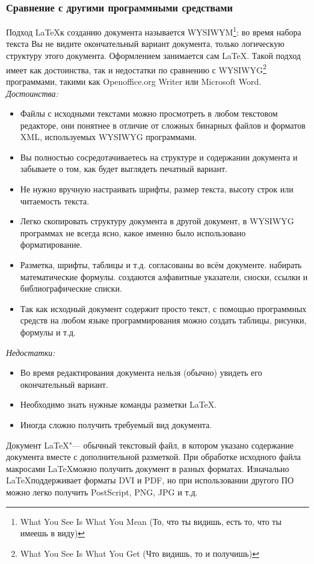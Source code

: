 \documentclass{article}
\begin{document}
		\subsubsection{Сравнение с другими программными средствами}
	Подход \LaTeX к созданию документа называется WYSIWYM\footnote{What You See Is What You Mean (То, что ты видишь, есть то, что ты имеешь в виду)}: во время набора текста Вы не видите окончательный вариант документа, только логическую структуру этого документа. Оформлением занимается сам \LaTeX. Такой подход имеет как достоинства, так и недостатки по сравнению с WYSIWYG\footnote{What You See Is What You Get (Что видишь, то и получишь)} программами, такими как Openoffice.org Writer или Microsoft Word.\\
	\textit{Достоинства:}
	\begin{itemize}
   		\item Файлы с исходными текстами можно просмотреть в любом текстовом редакторе, они понятнее в отличие от сложных бинарных файлов и форматов XML, используемых WYSIWYG программами.
   		\item Вы полностью сосредотачиваетесь на структуре и содержании документа и забываете о том, как будет выглядеть печатный вариант.
   		\item Не нужно вручную настраивать шрифты, размер текста, высоту строк или читаемость текста.
   		\item Легко скопировать структуру документа в другой документ, в WYSIWYG программах не всегда ясно, какое именно было использовано форматирование.
   		\item Разметка, шрифты, таблицы и т.д. согласованы во всём документе.
    	 набирать математические формулы.
    	 создаются алфавитные указатели, сноски, ссылки и библиографические списки.
   		\item Так как исходный документ содержит просто текст, с помощью программных средств на любом языке программирования можно создать таблицы, рисунки, формулы и т.д.
	\end{itemize}	
	\textit{Недостатки:}
	\begin{itemize}
		\item Во время редактирования документа нельзя (обычно) увидеть его окончательный вариант.
   		\item Необходимо знать нужные команды разметки \LaTeX.
   		\item Иногда сложно получить требуемый вид документа.
	\end{itemize}
	Документ \LaTeX "--- обычный текстовый файл, в котором указано содержание документа вместе с дополнительной разметкой. При обработке исходного файла макросами \LaTeX можно получить документ в разных форматах. Изначально \LaTeX поддерживает форматы DVI и PDF, но при использовании другого ПО можно легко получить PostScript, PNG, JPG и т.д.
\end{document}
